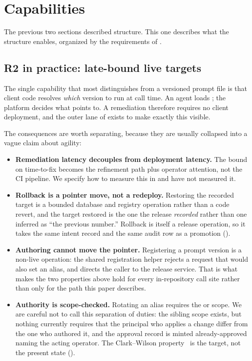 \section{Capabilities}
\label{sec:capabilities}

The previous two sections described structure. This one describes what the
structure enables, organized by the requirements of .

\subsection{R2 in practice: late-bound live targets}

The single capability that most distinguishes \sys from a versioned prompt file is
that client code resolves \emph{which} version to run at call time. An agent loads
\prodalias{}; the platform decides what \prodalias{} points to. A remediation
therefore requires no client deployment, and the outer lane of
 exists to make exactly this visible.

The consequences are worth separating, because they are usually collapsed into a
vague claim about agility:

\begin{itemize}
\item \textbf{Remediation latency decouples from deployment latency.} The bound on
      time-to-fix becomes the refinement path plus operator attention, not the CI
      pipeline. We specify how to measure this in  and have
      not measured it.
\item \textbf{Rollback is a pointer move, not a redeploy.} Restoring the recorded
      target is a bounded database and registry operation rather than a code
      revert, and the target restored is the one the release \emph{recorded}
      rather than one inferred as ``the previous number.'' Rollback is itself a
      release operation, so it takes the same intent record and the same audit
      row as a promotion ().
\item \textbf{Authoring cannot move the pointer.} Registering a prompt version is
      a non-live operation: the shared registration helper rejects a request that
      would also set an alias, and directs the caller to the release service.
      That is what makes the two properties above hold for every in-repository
      call site rather than only for the path this paper describes.
\item \textbf{Authority is scope-checked.} Rotating an alias requires the
      \operator{} or \admin{} scope. We are careful not to call this separation of
      duties: the sibling \approver{} scope exists, but nothing currently requires
      that the principal who applies a change differ from the one who authored it,
      and the approval record is minted already-approved naming the acting
      operator. The Clark--Wilson property~\cite{clark1987integrity} is the target,
      not the present state ().
\end{itemize}

